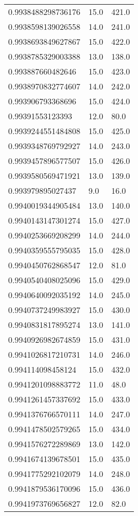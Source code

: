 \begin{center}
\begin{supertabular}[H]{p{0.30\textwidth}p{0.05\textwidth}p{0.05\textwidth}}
0.9938488298736176 & 15.0 & 421.0 \\ 
0.9938598139026558 & 14.0 & 241.0 \\ 
0.9938693849627867 & 15.0 & 422.0 \\ 
0.9938785329003388 & 13.0 & 138.0 \\ 
0.993887660482646 & 15.0 & 423.0 \\ 
0.9938970832774607 & 14.0 & 242.0 \\ 
0.993906793368696 & 15.0 & 424.0 \\ 
0.99391553123393 & 12.0 & 80.0 \\ 
0.9939244551484808 & 15.0 & 425.0 \\ 
0.9939348769792927 & 14.0 & 243.0 \\ 
0.9939457896577507 & 15.0 & 426.0 \\ 
0.9939580569471921 & 13.0 & 139.0 \\ 
0.993979895027437 & 9.0 & 16.0 \\ 
0.9940019344905484 & 13.0 & 140.0 \\ 
0.9940143147301274 & 15.0 & 427.0 \\ 
0.9940253669208299 & 14.0 & 244.0 \\ 
0.9940359555795035 & 15.0 & 428.0 \\ 
0.9940450762868547 & 12.0 & 81.0 \\ 
0.9940540408025096 & 15.0 & 429.0 \\ 
0.9940640092035192 & 14.0 & 245.0 \\ 
0.9940737249983927 & 15.0 & 430.0 \\ 
0.9940831817895274 & 13.0 & 141.0 \\ 
0.9940926982674859 & 15.0 & 431.0 \\ 
0.9941026817210731 & 14.0 & 246.0 \\ 
0.994114098458124 & 15.0 & 432.0 \\ 
0.9941201098883772 & 11.0 & 48.0 \\ 
0.9941261457337692 & 15.0 & 433.0 \\ 
0.9941376766570111 & 14.0 & 247.0 \\ 
0.9941478502579265 & 15.0 & 434.0 \\ 
0.9941576272289869 & 13.0 & 142.0 \\ 
0.9941674139678501 & 15.0 & 435.0 \\ 
0.9941775292102079 & 14.0 & 248.0 \\ 
0.9941879536170096 & 15.0 & 436.0 \\ 
0.9941973769656827 & 12.0 & 82.0 \\ 

\end{supertabular}
\end{center}
